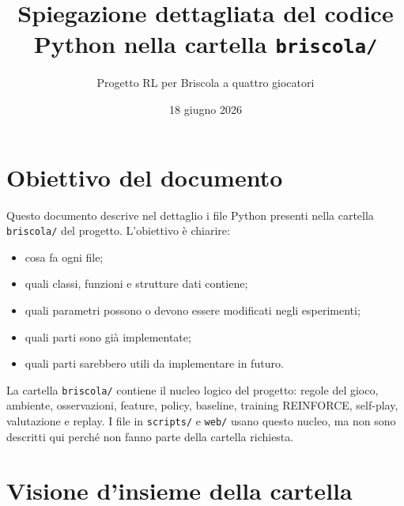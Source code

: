 \documentclass[11pt,a4paper]{article}
\title{Spiegazione dettagliata del codice Python nella cartella \texttt{briscola/}}
\author{Progetto RL per Briscola a quattro giocatori}
\date{18 giugno 2026}
\begin{document}
\maketitle
\tableofcontents
\newpage

\section{Obiettivo del documento}

Questo documento descrive nel dettaglio i file Python presenti nella cartella
\texttt{briscola/} del progetto. L'obiettivo è chiarire:

\begin{itemize}
  \item cosa fa ogni file;
  \item quali classi, funzioni e strutture dati contiene;
  \item quali parametri possono o devono essere modificati negli esperimenti;
  \item quali parti sono già implementate;
  \item quali parti sarebbero utili da implementare in futuro.
\end{itemize}

La cartella \texttt{briscola/} contiene il nucleo logico del progetto:
regole del gioco, ambiente, osservazioni, feature, policy, baseline,
training REINFORCE, self-play, valutazione e replay. I file in \texttt{scripts/}
e \texttt{web/} usano questo nucleo, ma non sono descritti qui perché non fanno
parte della cartella richiesta.

\section{Visione d'insieme della cartella}
\end{document}
